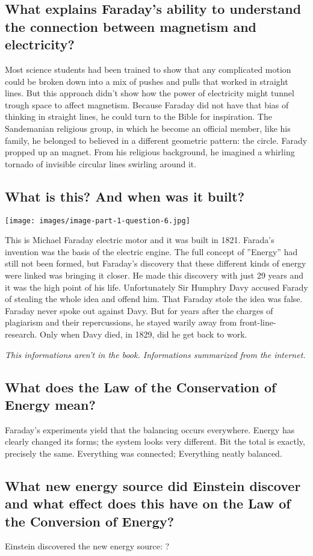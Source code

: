\subsection*{What explains Faraday’s ability to understand the connection between magnetism and electricity?}
Most science students had been trained to show that any complicated motion could be broken down into a mix of pushes and pulls that worked in straight lines. But this approach didn't show how the power of electricity might tunnel trough space to affect magnetism. Because Faraday did not have that bias of thinking in straight lines, he could turn to the Bible for inspiration. The Sandemanian religious group, in which he become an official member, like his family, he belonged to believed in a different geometric pattern: the circle. Farady propped up an magnet. From his religious background, he imagined a whirling tornado of invisible circular lines swirling around it.

\subsection*{What is this? And when was it built?}
\texttt{[image: images/image-part-1-question-6.jpg]}\par\vspace{1cm}

This is Michael Faraday electric motor and it was built in 1821. Farada's invention was the basis of the electric engine. The full concept of ''Energy'' had still not been formed, but Faraday's discovery that these different kinds of energy were linked was bringing it closer. He made this discovery with just 29 years and it was the high point of his life. Unfortunately Sir Humphry Davy accused Farady of stealing the whole idea and offend him. That Faraday stole the idea was false. Faraday never spoke out against Davy. But for years after the charges of plagiarism and their repercussions, he stayed warily away from front-line-research. Only when Davy died, in 1829, did he get back to work.

\emph{This informations aren't in the book. Informations summarized from the internet.}

\subsection*{What does the Law of the Conservation of Energy mean?}
Faraday's experiments yield that the balancing occurs everywhere. Energy has clearly changed its forms; the system looks very different. Bit the total is exactly, precisely the same. Everything was connected; Everything neatly balanced.

\subsection*{What new energy source did Einstein discover and what effect does this have on the Law of the Conversion of Energy?}

Einstein discovered the new energy source: ?